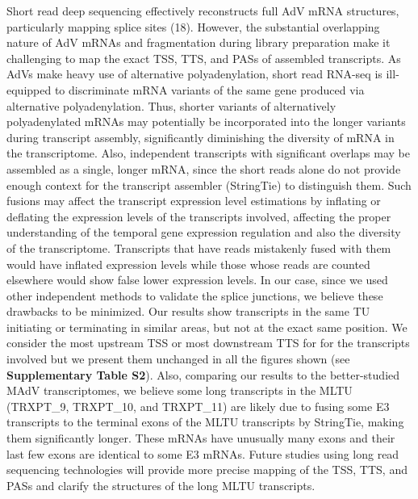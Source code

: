 \documentclass[
]{article}
\begin{document}
Short read deep sequencing effectively reconstructs full AdV mRNA
structures, particularly mapping splice sites (18). However, the
substantial overlapping nature of AdV mRNAs and fragmentation during
library preparation make it challenging to map the exact TSS, TTS, and
PASs of assembled transcripts. As AdVs make heavy use of alternative
polyadenylation, short read RNA-seq is ill-equipped to discriminate mRNA
variants of the same gene produced via alternative polyadenylation.
Thus, shorter variants of alternatively polyadenylated mRNAs may
potentially be incorporated into the longer variants during transcript
assembly, significantly diminishing the diversity of mRNA in the
transcriptome. Also, independent transcripts with significant overlaps
may be assembled as a single, longer mRNA, since the short reads alone
do not provide enough context for the transcript assembler (StringTie)
to distinguish them. Such fusions may affect the transcript expression
level estimations by inflating or deflating the expression levels of the
transcripts involved, affecting the proper understanding of the temporal
gene expression regulation and also the diversity of the transcriptome.
Transcripts that have reads mistakenly fused with them would have
inflated expression levels while those whose reads are counted elsewhere
would show false lower expression levels. In our case, since we used
other independent methods to validate the splice junctions, we believe
these drawbacks to be minimized. Our results show transcripts in the
same TU initiating or terminating in similar areas, but not at the exact
same position. We consider the most upstream TSS or most downstream TTS
for for the transcripts involved but we present them unchanged in all
the figures shown (see \textbf{Supplementary Table S2}). Also, comparing
our results to the better-studied MAdV transcriptomes, we believe some
long transcripts in the MLTU (TRXPT\_9, TRXPT\_10, and TRXPT\_11) are
likely due to fusing some E3 transcripts to the terminal exons of the
MLTU transcripts by StringTie, making them significantly longer. These
mRNAs have unusually many exons and their last few exons are identical
to some E3 mRNAs. Future studies using long read sequencing technologies
will provide more precise mapping of the TSS, TTS, and PASs and clarify
the structures of the long MLTU transcripts.
\end{document}
